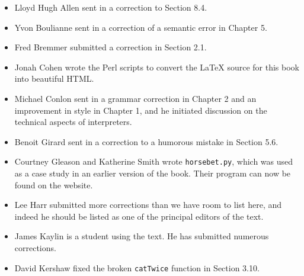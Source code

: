 \begin{itemize}

\item Lloyd Hugh Allen sent in a correction to Section 8.4.

\item Yvon Boulianne sent in a correction of a semantic error in
Chapter 5.

\item Fred Bremmer submitted a correction in Section 2.1.

\item Jonah Cohen wrote the Perl scripts to convert the
LaTeX source for this book into beautiful HTML.


\item Michael Conlon sent in a grammar correction in Chapter 2
and an improvement in style in Chapter 1, and he initiated discussion
on the technical aspects of interpreters.


\item Benoit Girard sent in a
correction to a humorous mistake in Section 5.6.


\item Courtney Gleason and Katherine Smith wrote {\tt horsebet.py},
which was used as a case study in an earlier version of the book.  Their
program can now be found on the website.


\item Lee Harr submitted more corrections than we have room to list
here, and indeed he should be listed as one of the principal editors
of the text.


\item James Kaylin is a student using the text. He has submitted
numerous corrections.


\item David Kershaw fixed the broken {\tt catTwice} function in Section
3.10.


\end{itemize}
